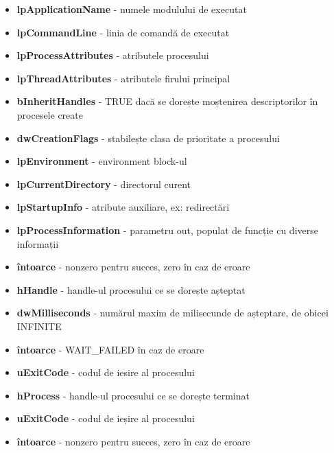 \documentclass{refcard.cs.pub.ro}
\begin{document}
\begin{multicols*}{3}
\begin{itemize}
\item \textbf{lpApplicationName} - numele modulului de executat
\item \textbf{lpCommandLine} - linia de comandă de executat
\item \textbf{lpProcessAttributes} - atributele procesului
\item \textbf{lpThreadAttributes} - atributele firului principal
\item \textbf{bInheritHandles} - TRUE dacă se dorește moștenirea descriptorilor în procesele create
\item \textbf{dwCreationFlags} - stabilește clasa de prioritate a procesului 
\item \textbf{lpEnvironment} - environment block-ul
\item \textbf{lpCurrentDirectory} - directorul curent
\item \textbf{lpStartupInfo} - atribute auxiliare, ex: redirectări
\item \textbf{lpProcessInformation} - parametru out, populat de funcție cu diverse informații
\item \textbf{întoarce} - nonzero pentru succes, zero în caz de eroare
\end{itemize}

\begin{itemize}
\item \textbf{hHandle} - handle-ul procesului ce se dorește așteptat
\item \textbf{dwMilliseconds} - numărul maxim de milisecunde de așteptare, de obicei INFINITE
\item \textbf{întoarce} - WAIT_FAILED în caz de eroare
\end{itemize}

\begin{itemize}
\item \textbf{uExitCode} - codul de iesire al procesului
\end{itemize}

\begin{itemize}
\item \textbf{hProcess} - handle-ul procesului ce se dorește terminat
\item \textbf{uExitCode} - codul de ieșire al procesului
\item \textbf{întoarce} - nonzero pentru succes, zero în caz de eroare 
\end{itemize}


\end{multicols*}
\end{document}
